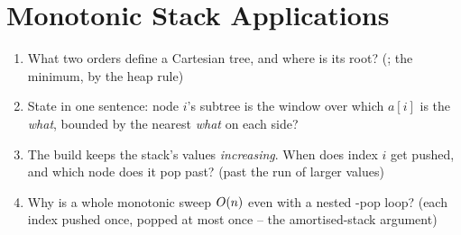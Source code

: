 \section{Monotonic Stack Applications}\label{sec:c26-monostack}

\begin{previouslybox}
\begin{enumerate}[nosep, leftmargin=1.6em]
  \item What two orders define a Cartesian tree, and where is its root? (; the
        minimum, by the heap rule)
  \item State  in one sentence: node $i$'s subtree is the window over which $a[i]$
        is the \emph{what}, bounded by the nearest \emph{what} on each side?
  \item The build  keeps the stack's values \emph{increasing}. When does index
        $i$ get pushed, and which node does it pop past? (past the run of larger values)
  \item Why is a whole monotonic sweep $O(n)$ even with a nested -pop loop? (each index
        pushed once, popped at most once -- the amortised-stack argument)
\end{enumerate}
\end{previouslybox}

